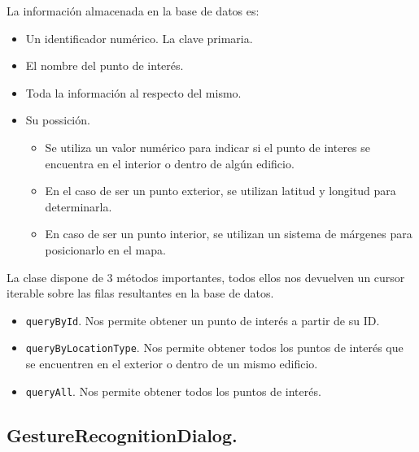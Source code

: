 \documentclass[11pt]{article}
\begin{document}
La información almacenada en la base de datos es:
\begin{itemize}
\item Un identificador numérico. La clave primaria.
\item El nombre del punto de interés.
\item Toda la información al respecto del mismo.
\item Su possición.
\begin{itemize}
\item Se utiliza un valor numérico para indicar si el punto de interes se encuentra en el interior o dentro de algún edificio.
\item En el caso de ser un punto exterior, se utilizan latitud y longitud para determinarla.
\item En caso de ser un punto interior, se utilizan un sistema de márgenes para posicionarlo en el mapa.
\end{itemize}
\end{itemize}

La clase dispone de 3 métodos importantes, todos ellos nos devuelven un cursor iterable sobre las filas resultantes en la base de datos.

\begin{itemize}
\item \texttt{queryById}. Nos permite obtener un punto de interés a partir de su ID.
\item \texttt{queryByLocationType}. Nos permite obtener todos los puntos de interés que se encuentren en el exterior o dentro de un mismo edificio.
\item \texttt{queryAll}. Nos permite obtener todos los puntos de interés.
\end{itemize}

\subsection{GestureRecognitionDialog.}
\label{sec:org2c169d5}
\end{document}
